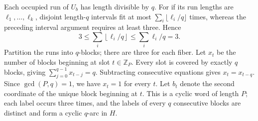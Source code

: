 \documentclass[11pt]{article}
\newcommand{\Z}{\mathbb Z}
\begin{document}
Each occupied run of $U_b$ has length divisible by $q$.  For if its run
lengths are $\ell_1,\ldots,\ell_k$, disjoint length-$q$ intervals fit
at most $\sum_i\lfloor\ell_i/q\rfloor$ times, whereas the preceding
interval argument requires at least three.  Hence
\[
 3\leq\sum_i\left\lfloor\ell_i/q\right\rfloor
 \leq\sum_i\ell_i/q=3.
\]
Partition the runs into $q$-blocks; there are three for each fiber.
Let $x_t$ be the number of blocks beginning at slot $t\in\Z_P$.
Every slot is covered by exactly $q$ blocks, giving
$\sum_{j=0}^{q-1}x_{t-j}=q$.  Subtracting consecutive equations gives
$x_t=x_{t-q}$.  Since $\gcd(P,q)=1$, we have $x_t=1$ for every $t$.
Let $b_t$ denote the second coordinate of the unique block beginning
at $t$.  This is a cyclic word of length $P$; each label occurs three
times, and the labels of every $q$ consecutive blocks are distinct
and form a cyclic $q$-arc in $H$.
\end{document}
